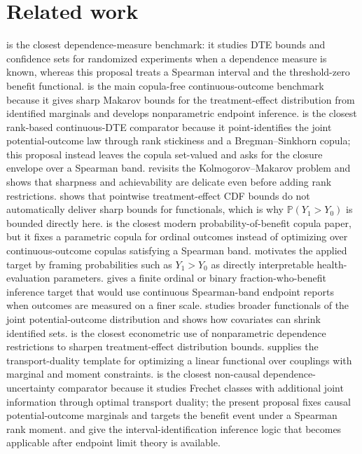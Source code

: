 \documentclass[11pt]{article}
\renewcommand{\Pr}{\mathbb{P}}
\theoremstyle{definition}
\theoremstyle{plain}
\theoremstyle{remark}
\begin{document}
\section{Related work}
\citet{FanPark2009DTEConfidenceSets} is the closest dependence-measure benchmark: it studies DTE bounds and confidence sets for randomized experiments when a dependence measure is known, whereas this proposal treats a Spearman interval and the threshold-zero benefit functional.  \citet{FanPark2010DTEBounds} is the main copula-free continuous-outcome benchmark because it gives sharp Makarov bounds for the treatment-effect distribution from identified marginals and develops nonparametric endpoint inference.  \citet{Liang2026RankStickiness} is the closest rank-based continuous-DTE comparator because it point-identifies the joint potential-outcome law through rank stickiness and a Bregman--Sinkhorn copula; this proposal instead leaves the copula set-valued and asks for the closure envelope over a Spearman band.  \citet{ZhangRichardson2025Kolmogorov} revisits the Kolmogorov--Makarov problem and shows that sharpness and achievability are delicate even before adding rank restrictions.  \citet{FirpoRidder2019Functionals} shows that pointwise treatment-effect CDF bounds do not automatically deliver sharp bounds for functionals, which is why \(\Pr(Y_1>Y_0)\) is bounded directly here.  \citet{HeLi2026OrdinalCopula} is the closest modern probability-of-benefit copula paper, but it fixes a parametric copula for ordinal outcomes instead of optimizing over continuous-outcome copulas satisfying a Spearman band.  \citet{Mullahy2018InequalityProbability} motivates the applied target by framing probabilities such as \(Y_1>Y_0\) as directly interpretable health-evaluation parameters.  \citet{HuangFangHanleyRosenblum2019FractionBenefit} gives a finite ordinal or binary fraction-who-benefit inference target that would use continuous Spearman-band endpoint reports when outcomes are measured on a finer scale.  \citet{FanGuerreZhu2017POFunctionals} studies broader functionals of the joint potential-outcome distribution and shows how covariates can shrink identified sets.  \citet{FrandsenLefgren2021KIPP} is the closest econometric use of nonparametric dependence restrictions to sharpen treatment-effect distribution bounds.  \citet{Kellerer1984Duality} supplies the transport-duality template for optimizing a linear functional over couplings with marginal and moment constraints.  \citet{BartlKupperLuxPapapantoleon2022Dependence} is the closest non-causal dependence-uncertainty comparator because it studies Frechet classes with additional joint information through optimal transport duality; the present proposal fixes causal potential-outcome marginals and targets the benefit event under a Spearman rank moment.  \citet{ImbensManski2004PartialCI} and \citet{Stoye2009MoreCI} give the interval-identification inference logic that becomes applicable after endpoint limit theory is available.
\end{document}
